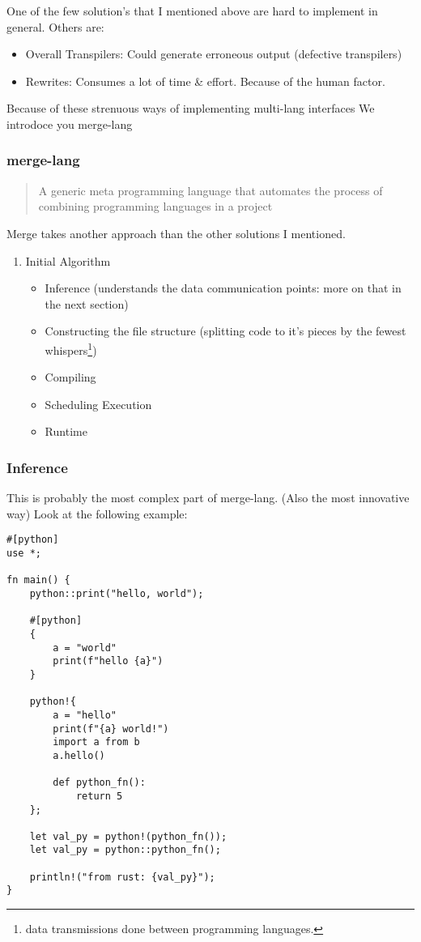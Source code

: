 \documentclass[9pt,twocolumn]{article}
\begin{document}
One of the few solution's that I mentioned above are hard to implement in general. Others are:

\begin{itemize}
\item Overall Transpilers: Could generate erroneous output (defective transpilers)
\item Rewrites: Consumes a lot of time \& effort. Because of the human factor.
\end{itemize}

Because of these strenuous ways of implementing multi-lang interfaces We introdoce you merge-lang

\subsubsection{merge-lang}
\label{sec:org4489f97}
\begin{quote}
A generic meta programming language that automates the process of combining programming languages in a project
\end{quote}

Merge takes another approach than the other solutions I mentioned.

\begin{enumerate}
\item Initial Algorithm
\label{sec:orgd974185}
\begin{itemize}
\item Inference (understands the data communication points: more on that in the next section)
\item Constructing the file structure (splitting code to it's pieces by the fewest whispers\footnote{data transmissions done between programming languages.})
\item Compiling
\item Scheduling Execution
\item Runtime
\end{itemize}
\end{enumerate}


\subsubsection{Inference}
\label{sec:orgbd6e88e}
This is probably the most complex part of merge-lang. (Also the most innovative way)
Look at the following example:

\begin{verbatim}
#[python]
use *;

fn main() {
    python::print("hello, world");

    #[python]
    {
        a = "world"
        print(f"hello {a}")
    }

    python!{
        a = "hello"
        print(f"{a} world!")
        import a from b
        a.hello()

        def python_fn():
            return 5
    };

    let val_py = python!(python_fn());
    let val_py = python::python_fn();

    println!("from rust: {val_py}");
}
\end{verbatim}
\end{document}
